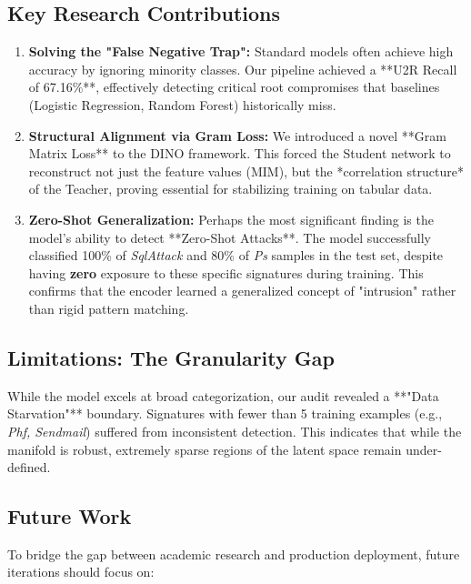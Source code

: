 \documentclass[
  10pt,
  twocolumn,
  a4paper,
  parskip=half
]{scrartcl}
\begin{document}
    \subsection{Key Research Contributions}
    \begin{enumerate}
        \item \textbf{Solving the "False Negative Trap":}
        Standard models often achieve high accuracy by ignoring minority classes. Our pipeline achieved a **U2R Recall of 67.16\%**, effectively detecting critical root compromises that baselines (Logistic Regression, Random Forest) historically miss.

        \item \textbf{Structural Alignment via Gram Loss:}
        We introduced a novel **Gram Matrix Loss** to the DINO framework. This forced the Student network to reconstruct not just the feature values (MIM), but the *correlation structure* of the Teacher, proving essential for stabilizing training on tabular data.

        \item \textbf{Zero-Shot Generalization:}
        Perhaps the most significant finding is the model's ability to detect **Zero-Shot Attacks**. The model successfully classified 100\% of \textit{SqlAttack} and 80\% of \textit{Ps} samples in the test set, despite having \textbf{zero} exposure to these specific signatures during training. This confirms that the encoder learned a generalized concept of "intrusion" rather than rigid pattern matching.
    \end{enumerate}

    \subsection{Limitations: The Granularity Gap}
    While the model excels at broad categorization, our audit revealed a **"Data Starvation"** boundary. Signatures with fewer than 5 training examples (e.g., \textit{Phf, Sendmail}) suffered from inconsistent detection. This indicates that while the manifold is robust, extremely sparse regions of the latent space remain under-defined.

    \subsection{Future Work}
    To bridge the gap between academic research and production deployment, future iterations should focus on:
\end{document}
